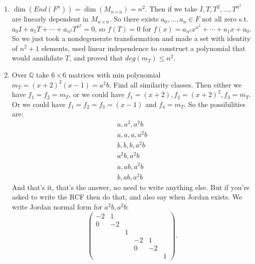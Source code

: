 \documentclass[9pt,reqno,twoside]{amsbook}
\theoremstyle{plain}
\numberwithin{section}{chapter}
\numberwithin{equation}{chapter}
\theoremstyle{definition}
\theoremstyle{remark}
\theoremstyle{plain}
\newcommand{\Q}{\mathbb{Q}}
\newcommand{\bee}{\begin{equation}\begin{aligned}}
\newcommand{\eee}{\end{aligned}\end{equation}}
\newcommand{\lpar}{\left(}
\newcommand{\rpar}{\right)}
\renewcommand{\leq}{\leqslant}
\begin{document}
\begin{enumerate}[label = \arabic*.]
\begin{proof}
This is a case by case argument. We know the degree of $c_T$ is 3. If $deg(m_T) = 3$ then we are done, we only have 1 invariant factor and the RCF (similarity class) is in 1-1 correspondence with invariant factors. Now suppose $m_T$ has degree 2. Then the remaining invariant factor must have degree 1 and divide $m_T$, so it is just equal to $c_T/m_T$ which is unique, so we're done. If $m_T$ has degree 1 then all three invariant factors are equal to it and we are done. 
\end{proof}

\setcounter{enumi}{4}

\item $\dim(End(F^n)) = \dim(M_{n \times n}) = n^2$. Then if we take $I,T,T^2,...,T^{n^2}$ are linearly dependent in $M_{n \times n}$. So there exists $a_0,...,a_n \in F$ not all zero s.t. $a_0I + a_1T + \cdots + a_{n^2}T^{n^2} = 0$, so $f(T) = 0$ for $f(x) = a_{n^2}x^{n^2} + \cdots + a_1x + a_0$. So we just took a nondegenerate transformation and made a set with identity of $n^2 + 1$ elements, used linear independence to construct a polynomial that would annihilate $T$, and proved that $deg(m_T) \leq n^2$. 

\setcounter{enumi}{9}

\item Over $\Q$ take $6 \times 6$ matrices with min polynomial $m_T= (x + 2)^2(x - 1) = a^2b$. Find all similarity classes. Then either we have $f_1 = f_2 = m_T$, or we could have $f_1 = (x + 2),f_2 = (x + 2)^2, f_3 = m_T$. Or we could have $f_1 = f_2 = f_3 = (x - 1)$ and $f_4 = m_T$. 
So the possibilities are:
\bee
a,a^2, a^2b\\
a,a,a,a^2b\\
b,b,b,a^2b\\
a^2b,a^2b\\
a,ab, a^2b\\
b,ab,a^2b
\eee
And that's it, that's the answer, no need to write anything else. But if you're asked to write the RCF then do that, and also say when Jordan exists. We write Jordan normal form for $a^2b,a^2b$:
$$
\lpar 
\begin{matrix}
-2 & 1 & & &\\
0 & -2 & & & \\
& & 1\\
& & & -2 & 1\\
& & & 0 & -2\\
& & & & & 1
\end{matrix} \rpar.
$$



\end{enumerate}
\end{document}
